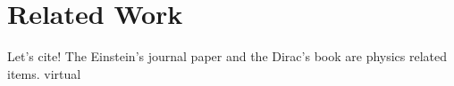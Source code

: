 \chapter{Related Work}


\bigskip

Let's cite! The Einstein's journal paper \cite{westwood1998validation} and the Dirac's book \cite{dirac} are physics related items. \cite{ryan2001narrative} virtual




































